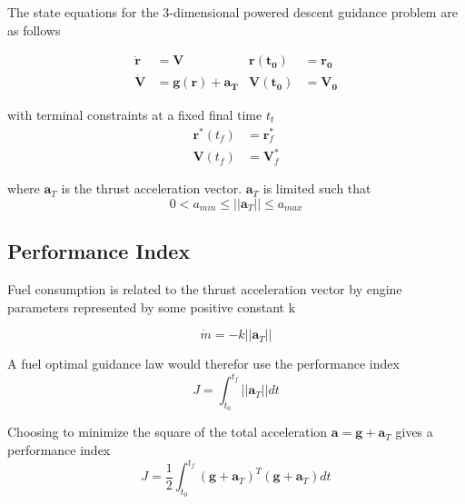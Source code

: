 The state equations for the 3-dimensional powered descent guidance problem are as follows

\begin{align}
\label{eqn:EoM1}
\boldsymbol{\dot{r}} &= \boldsymbol{V}                               & \boldsymbol{r(t_0)} &= \boldsymbol{r_0}\\
\label{eqn:EoM2}
\boldsymbol{\dot{V}} &= \boldsymbol{g(r)} + \boldsymbol{a_T}                           & \boldsymbol{V(t_0)} &= \boldsymbol{V_0}
\end{align}


with terminal constraints at a fixed final time $t_t$
\begin{align}
\label{eqn:constraint_r}
\boldsymbol{r}^*(t_f) &= \boldsymbol{r}^*_f\\
\label{eqn:constraint_V}
\boldsymbol{V}(t_f) &= \boldsymbol{V}^*_f 
\end{align}

where $\boldsymbol{a}_T$ is the thrust acceleration vector. $\boldsymbol{a}_T$ is limited such that
\begin{equation} 
\label{eqn:thrustlimit}
0 < a_{min} \leq ||\boldsymbol{a}_T|| \leq a_{max}
\end{equation}

\subsection{Performance Index}
Fuel consumption is related to the thrust acceleration vector by engine parameters represented by some positive constant k

\begin{equation}
\label{eqn:fuel_rate}
\dot{m} = -k ||\boldsymbol{a}_T||
\end{equation}

A fuel optimal guidance law would therefor use the performance index
\begin{equation}
\label{eqn:fueloptimalindex}
J = \int_{t_0}^{t_f} ||\boldsymbol{a}_T||dt
\end{equation}

Choosing to minimize the square of the total acceleration $\boldsymbol{a} = \boldsymbol{g} + \boldsymbol{a}_T$ gives a performance index
\begin{equation}
\label{eqn:performanceindex}
J = \frac{1}{2} \int_{t_0}^{t_f} (\boldsymbol{g}+\boldsymbol{a}_T)^T(\boldsymbol{g}+\boldsymbol{a}_T)dt
\end{equation}

